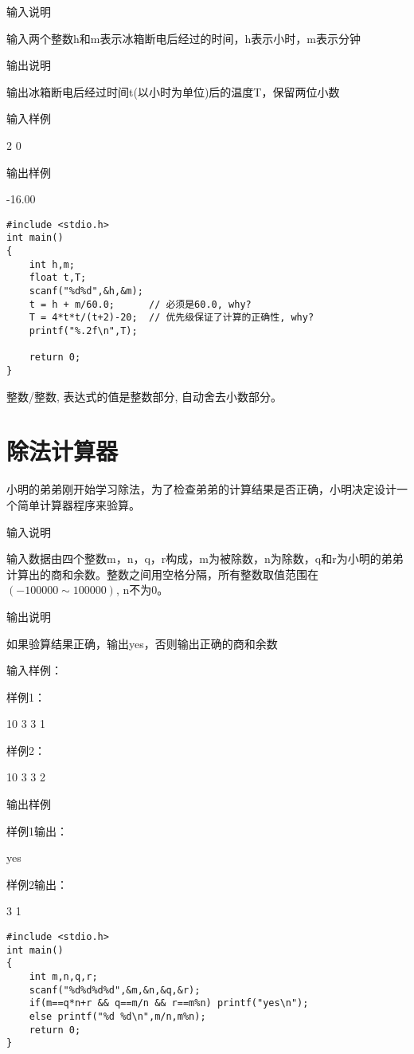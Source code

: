 输入说明	

输入两个整数h和m表示冰箱断电后经过的时间，h表示小时，m表示分钟

输出说明
	
输出冰箱断电后经过时间t(以小时为单位)后的温度T，保留两位小数

输入样例
	
2 0

输出样例
	
-16.00

\begin{lstlisting}
#include <stdio.h>
int main()
{
	int h,m;
	float t,T;
	scanf("%d%d",&h,&m);
	t = h + m/60.0;      // 必须是60.0, why?
	T = 4*t*t/(t+2)-20;  // 优先级保证了计算的正确性, why?
	printf("%.2f\n",T);
	
	return 0;
}
\end{lstlisting}

\begin{note}[知识点]
	整数/整数, 表达式的值是整数部分, 自动舍去小数部分。
\end{note}

\section{除法计算器}	
小明的弟弟刚开始学习除法，为了检查弟弟的计算结果是否正确，小明决定设计一个简单计算器程序来验算。

输入说明
	
输入数据由四个整数m，n，q，r构成，m为被除数，n为除数，q和r为小明的弟弟计算出的商和余数。整数之间用空格分隔，所有整数取值范围在$(-100000\sim 100000)$, n不为0。

输出说明
	
如果验算结果正确，输出yes，否则输出正确的商和余数

输入样例：

样例1：

10 3 3 1

样例2：

10 3 3 2

输出样例	

样例1输出：

yes

样例2输出：

3 1

\begin{lstlisting}
#include <stdio.h>
int main()
{
	int m,n,q,r;
	scanf("%d%d%d%d",&m,&n,&q,&r);
	if(m==q*n+r && q==m/n && r==m%n) printf("yes\n");
	else printf("%d %d\n",m/n,m%n); 
	return 0;
} 
\end{lstlisting}

